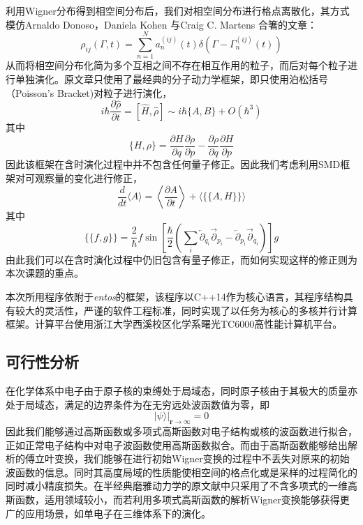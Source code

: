 利用Wigner分布得到相空间分布后，我们对相空间分布进行格点离散化，其方式模仿Arnaldo Donoso，Daniela Kohen 与Craig C. Martens 合箸的文章\cite{donoso2000simulation}：
\begin{equation}
\rho_{i j}(\Gamma, t)=\sum_{n=1}^{N} a_{n}^{(i j)}(t) \delta\left(\Gamma-\Gamma_{n}^{(i j)}(t)\right)
\end{equation} 
从而将相空间分布化简为多个互相之间不存在相互作用的粒子，而后对每个粒子进行单独演化。原文章只使用了最经典的分子动力学框架，即只使用泊松括号（Poisson's Bracket)对粒子进行演化，
\begin{equation}
	i \hbar \frac{\partial \hat{\rho}}{\partial t}=[\hat{H}, \hat{\rho}] \sim i \hbar\{A, B\}+O\left(\hbar^{3}\right)
\end{equation}
其中
\begin{equation}
	\{H, \rho\}=\frac{\partial H}{\partial q} \frac{\partial \rho}{\partial p}-\frac{\partial \rho}{\partial q} \frac{\partial H}{\partial p}
\end{equation}
因此该框架在含时演化过程中并不包含任何量子修正。因此我们考虑利用SMD框架对可观察量的变化进行修正，
\begin{equation}
	\frac{d}{d t}\langle A\rangle=\left\langle\frac{\partial A}{\partial t}\right\rangle+\langle\{\{A, H\}\}\rangle
	\label{Ehrenfest_in_proposal}
\end{equation}
其中
 \begin{equation}
	 \{\{f, g\}\}=\frac{2}{\hbar} f \sin \left[\frac{\hbar}{2}\left(\sum_{i} \overleftarrow{\partial}_{q_{i}} \overrightarrow{\partial}_{p_{i}}-\overleftarrow{\partial}_{p_{i}} \overrightarrow{\partial}_{q_{i}}\right)\right] g
\end{equation}
由此我们可以在含时演化过程中仍旧包含有量子修正，而如何实现这样的修正则为本次课题的重点。

本次所用程序依附于\emph{entos}的框架，该程序以C++14作为核心语言，其程序结构具有较大的灵活性，严谨的软件工程标准，同时实现了以任务为核心的多核并行计算框架\cite{Manby2019}。计算平台使用浙江大学西溪校区化学系曙光TC6000高性能计算机平台。

\subsection{可行性分析}
在化学体系中电子由于原子核的束缚处于局域态，同时原子核由于其极大的质量亦处于局域态，满足的边界条件为在无穷远处波函数值为零，即
\begin{equation}
	| \psi \rangle \big|_{\boldsymbol{r}\rightarrow \infty} = 0
\end{equation} 
因此我们能够通过高斯函数或多项式高斯函数对电子结构或核的波函数进行拟合，正如正常电子结构中对电子波函数使用高斯函数拟合。而由于高斯函数能够给出解析的傅立叶变换，我们能够在进行初始Wigner变换的过程中不丢失对原来的初始波函数的信息。同时其高度局域的性质能使相空间的格点化或是采样的过程简化的同时减小精度损失。在半经典磨雅动力学的原文献中\cite{LinjunSemiclassical}只采用了不含多项式的一维高斯函数，适用领域较小，而若利用多项式高斯函数的解析Wigner变换能够获得更广的应用场景，如单电子在三维体系下的演化。

